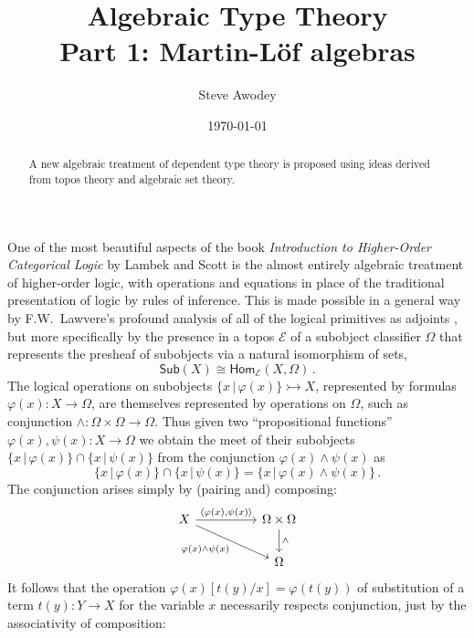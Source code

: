 \documentclass[12pt,reqno]{amsart}
\newcommand{\EE}{\ensuremath{\mathcal{E}}}
\newcommand{\Hom}{\ensuremath{\mathsf{Hom}}}
\newcommand{\mono}{\ensuremath{\rightarrowtail}}
\renewcommand{\to}{\ensuremath{\rightarrow}}
\theoremstyle{remark}
\theoremstyle{definition}
\begin{document}

\title{Algebraic Type Theory\\
Part 1: {M}artin-{L}\"of algebras}
\author{Steve Awodey}
\date{\today}

\begin{abstract}
A new algebraic treatment of dependent type theory is proposed using ideas derived from topos theory and algebraic set theory.
\end{abstract}
\maketitle

One of the most beautiful aspects of the book \emph{Introduction to Higher-Order Categorical Logic} by Lambek and Scott is the almost entirely algebraic treatment of higher-order logic, with operations and equations in place of the traditional presentation of logic by rules of inference.   This is made possible in a general way by F.W.\ Lawvere's profound analysis of all of the logical primitives as adjoints \cite{Lawvere:adjointness}, but more specifically by the presence in a topos $\EE$ of a subobject classifier $\Omega$ that represents the presheaf of subobjects via a natural isomorphism of sets,
\[
\mathsf{Sub}(X) \cong \Hom_{\EE}(X, \Omega)\,.
\]
The logical operations on subobjects $\{x\,|\, \varphi(x)\} \mono X$, represented by formulas $\varphi(x) : X \to \Omega$, are themselves represented by operations on $\Omega$, such as conjunction $\wedge : \Omega \times \Omega \to \Omega$.  Thus given two ``propositional functions'' $\varphi(x), \psi(x) : X \to \Omega$ we obtain the meet of their subobjects $\{x\,|\, \varphi(x)\}\cap \{x\,|\, \psi(x)\}$ from the conjunction $\varphi(x)\wedge\psi(x)$ as 
\[
\{x\,|\, \varphi(x)\}\cap \{x\,|\, \psi(x)\} = \{x\,|\, \varphi(x) \wedge \psi(x)\} \,.
\]
The conjunction arises simply by (pairing and) composing:
\begin{equation*}
\begin{tikzcd}
 X \ar[rr, "{\langle \varphi(x), \psi(x) \rangle}" ] \ar[rrd,swap,  "\varphi(x)\wedge\psi(x)"] && \Omega \times \Omega \ar[d, "\wedge"] \\
 && \Omega 
\end{tikzcd}
\end{equation*}
It follows that the operation $\varphi(x)[t(y)/x] = \varphi(t(y))$ of substitution of a term $t(y) : Y\to X$ for the variable $x$ necessarily respects  conjunction, just by the associativity of composition:
\end{document}
